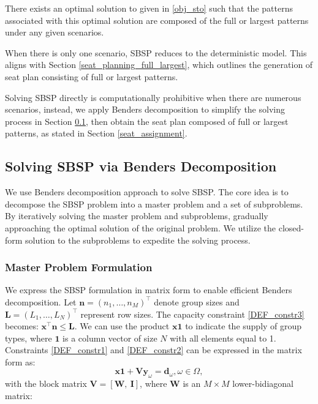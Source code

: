 \begin{prop}\label{prop_solution}
There exists an optimal solution to  given in \eqref{obj_sto} such that the patterns associated with this optimal solution are composed of the full or largest patterns under any given scenarios.
\end{prop}

When there is only one scenario, SBSP reduces to the deterministic model. This aligns with Section \ref{seat_planning_full_largest}, which outlines the generation of seat plan consisting of full or largest patterns.

Solving SBSP directly is computationally prohibitive when there are numerous scenarios, instead, we apply Benders decomposition to simplify the solving process in Section \ref{solve_by_benders}, then obtain the seat plan composed of full or largest patterns, as stated in Section \ref{seat_assignment}.

\subsection{Solving SBSP via Benders Decomposition}\label{solve_by_benders}
We use Benders decomposition approach \citep{bnnobrs1962partitioning} to solve SBSP. The core idea is to decompose the SBSP problem into a master problem and a set of subproblems. By iteratively solving the master problem and subproblems, gradually approaching the optimal solution of the original problem. We utilize the closed-form solution to the subproblems to expedite the solving process.

\subsubsection{Master Problem Formulation}
We express the SBSP formulation in matrix form to enable efficient Benders decomposition. 
Let $\mathbf{n} = (n_1, \ldots, n_M)^{\intercal}$ denote group sizes and $\mathbf{L} = (L_1, \ldots, L_N)^{\intercal}$ represent row sizes. The capacity constraint \eqref{DEF_constr3} becomes: $\mathbf{x}^{\intercal} \mathbf{n} \leq \mathbf{L}$. We can use the product $\mathbf{x} \mathbf{1}$ to indicate the supply of group types, where $\mathbf{1}$ is a column vector of size $N$ with all elements equal to 1. Constraints \eqref{DEF_constr1} and \eqref{DEF_constr2} can be expressed in the matrix form as:
\[\mathbf{x} \mathbf{1} + \mathbf{V} \mathbf{y}_\omega = \mathbf{d}_\omega, \omega\in \Omega,\]
with the block matrix $\mathbf{V} = [\mathbf{W}, ~\mathbf{I}]$, where $\mathbf{W}$ is an $M \times M$ lower-bidiagonal matrix:

